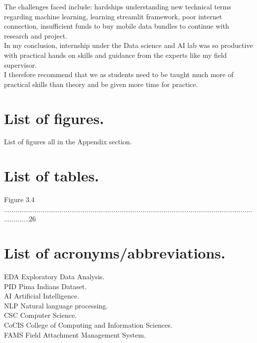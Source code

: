 \documentclass[11pt]{article}
\begin{document}
	The challenges faced include: hardships understanding new technical terms regarding machine learning, learning streamlit framework, poor internet connection, insufficient funds to buy mobile data bundles to continue with research and project.\\
	
	In my conclusion, internship under the Data science and AI lab was so productive with practical hands on skills and guidance from the experts like my field supervisor.\\
	
	I therefore recommend that we as students need to be taught much more of practical skills than theory and be given more time for practice.\\
	
	
	
	
	
	\thispagestyle{empty}


\newpage
\tableofcontents
\thispagestyle{empty}
\cleardoublepage
\setcounter{page}{1}

\newpage
\section*{List of figures.}
List of figures all in the Appendix section.\\

\newpage
\section*{List of tables.}
Figure 3.4 ..............................................................................................................................................26\\


\newpage
\section*{List of acronyms/abbreviations.}
EDA Exploratory Data Analysis.\\
PID	Pima Indians Dataset.\\
AI Artificial Intelligence.\\
NLP Natural language processing.\\
CSC Computer Science.\\
CoCIS College of Computing and Information Sciences.\\
FAMS Field Attachment Management System.\\
\end{document}
